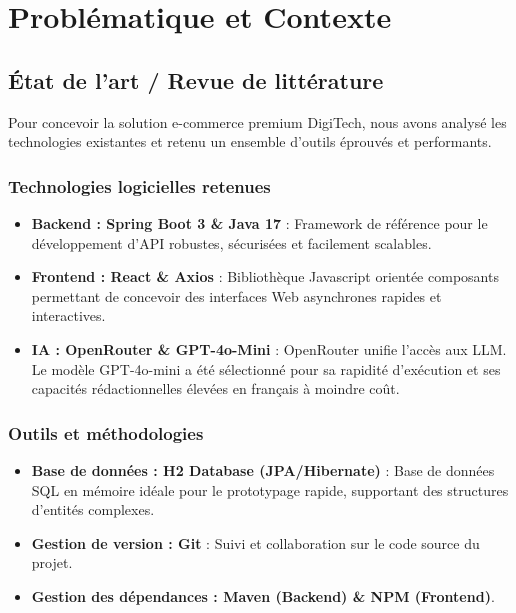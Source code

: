 \documentclass[12pt,a4paper,oneside]{report}
\begin{document}
\chapter{Problématique et Contexte}

\section{État de l’art / Revue de littérature}
Pour concevoir la solution e-commerce premium DigiTech, nous avons analysé les technologies existantes et retenu un ensemble d'outils éprouvés et performants.

\subsection{Technologies logicielles retenues}
\begin{itemize}
    \item \textbf{Backend : Spring Boot 3 \& Java 17} : Framework de référence pour le développement d'API robustes, sécurisées et facilement scalables.
    \item \textbf{Frontend : React \& Axios} : Bibliothèque Javascript orientée composants permettant de concevoir des interfaces Web asynchrones rapides et interactives.
    \item \textbf{IA : OpenRouter \& GPT-4o-Mini} : OpenRouter unifie l'accès aux LLM. Le modèle GPT-4o-mini a été sélectionné pour sa rapidité d'exécution et ses capacités rédactionnelles élevées en français à moindre coût.
\end{itemize}

\subsection{Outils et méthodologies}
\begin{itemize}
    \item \textbf{Base de données : H2 Database (JPA/Hibernate)} : Base de données SQL en mémoire idéale pour le prototypage rapide, supportant des structures d'entités complexes.
    \item \textbf{Gestion de version : Git} : Suivi et collaboration sur le code source du projet.
    \item \textbf{Gestion des dépendances : Maven (Backend) \& NPM (Frontend)}.
\end{itemize}
\end{document}
